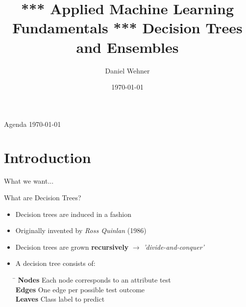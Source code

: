 


\title[Decision Trees and Ensembles]{*** Applied Machine Learning Fundamentals *** Decision Trees and Ensembles}
\author{Daniel Wehner}
\date{\today}




\maketitlepage


\begin{frame}{Agenda \today}
	\begin{multicols}{2}
		\tableofcontents
	\end{multicols}
\end{frame}


\section{Introduction}

\begin{frame}{What we want...}{}
\end{frame}


\begin{frame}{What are Decision Trees?}{}
	\begin{itemize}
		\item Decision trees are induced in a  fashion
		\item Originally invented by \textit{Ross Quinlan} (1986)
		\item Decision trees are grown \textbf{recursively} $\rightarrow$ \textit{'divide-and-conquer'}
		\item A decision tree consists of:

		\begin{tabbing}
			\hspace*{2.5cm}\= \kill
			\textbf{Nodes}	\>	Each node corresponds to an attribute test 	\\
			\textbf{Edges}	\>	One edge per possible test outcome			\\
			\textbf{Leaves}	\>	Class label to predict
		\end{tabbing}
	\end{itemize}
\end{frame}


